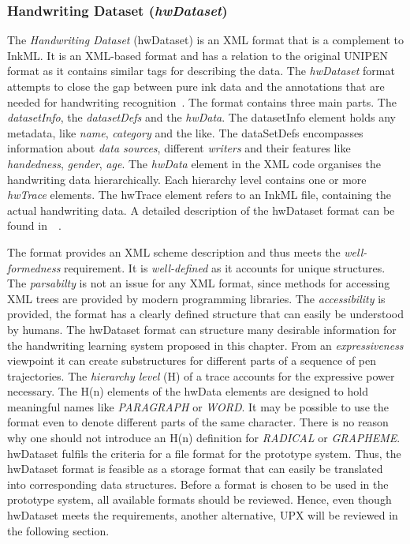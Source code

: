 \subsubsection{Handwriting Dataset (\emph{hwDataset})}
\label{sec:hwre:hwdataset}

The \emph{Handwriting Dataset} (hwDataset) is an XML format that is a complement
to InkML. It is an XML-based format and has a relation to the original 
UNIPEN format as it contains similar tags for describing the data. 
The \emph{hwDataset} format attempts to close the gap between pure ink data and 
the annotations that are needed for handwriting 
recognition~. 
The format contains three main parts. The \emph{datasetInfo}, 
the \emph{datasetDefs} and the \emph{hwData}. The datasetInfo element holds
any metadata, like \emph{name}, \emph{category} and the like.
The dataSetDefs encompasses information about \emph{data sources}, different
\emph{writers} and their features like \emph{handedness}, \emph{gender}, 
\emph{age}. The \emph{hwData} element in the XML code organises the 
handwriting data hierarchically. Each hierarchy level contains one or 
more \emph{hwTrace} elements. The hwTrace element refers to an InkML file, 
containing the actual handwriting data. A detailed description of the hwDataset 
format can be found in~~\citeyear{Bhaskarabhatla2004}. 

The format provides an XML scheme description and thus meets the 
\emph{well-formedness} requirement. It is \emph{well-defined} 
as it accounts for unique structures. The \emph{parsabilty} is not an 
issue for any XML format, since methods for accessing XML trees are provided 
by modern programming libraries.
The \emph{accessibility} is provided, the format has a clearly defined structure
that can easily be understood by humans.
The hwDataset format can structure many desirable information for the handwriting
learning system proposed in this chapter. 
From an \emph{expressiveness} viewpoint it can create substructures for 
different parts of a sequence of pen trajectories. The \emph{hierarchy level} (H)
of a trace accounts for the expressive power necessary. The H(n) elements 
of the hwData elements are designed to hold meaningful names like 
\emph{PARAGRAPH} or \emph{WORD}. It may be possible to use the format even to 
denote different parts of the same character. There is no reason why one should
not introduce an H(n) definition for \emph{RADICAL} or \emph{GRAPHEME}.
hwDataset fulfils the criteria for a file format for the prototype system.
Thus, the hwDataset format is feasible as a storage format that can easily be 
translated into corresponding data structures.
Before a format is chosen to be used in the prototype system, all available 
formats should be reviewed. Hence, even though hwDataset meets the requirements,
another alternative, UPX will be reviewed in the following section.

